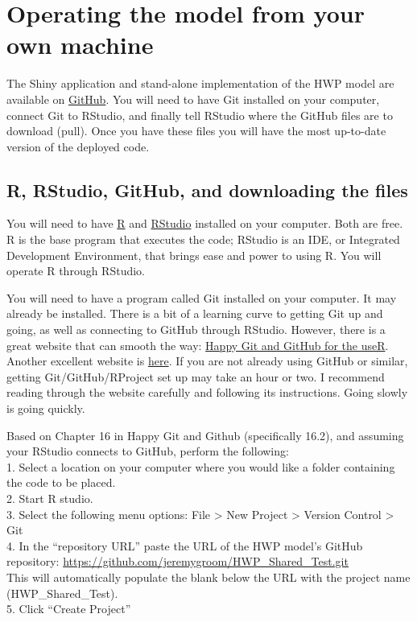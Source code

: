 \documentclass[
]{book}
\begin{document}
\hypertarget{run-opp}{%
\section{Operating the model from your own machine}\label{run-opp}}

The Shiny \citep{R-shiny} application and stand-alone implementation of the HWP model are available on \href{https://github.com/}{GitHub}. You will need to have Git installed on your computer, connect Git to RStudio, and finally tell RStudio where the GitHub files are to download (pull). Once you have these files you will have the most up-to-date version of the deployed code.

\hypertarget{run-opp-git}{%
\subsection{R, RStudio, GitHub, and downloading the files}\label{run-opp-git}}

You will need to have \href{https://www.r-project.org/}{R} and \href{https://www.rstudio.com/products/rstudio/}{RStudio} installed on your computer. Both are free. R is the base program that executes the code; RStudio is an IDE, or Integrated Development Environment, that brings ease and power to using R. You will operate R through RStudio.

You will need to have a program called Git installed on your computer. It may already be installed. There is a bit of a learning curve to getting Git up and going, as well as connecting to GitHub through RStudio. However, there is a great website that can smooth the way: \href{https://happygitwithr.com/index.html}{Happy Git and GitHub for the useR}. Another excellent website is \href{https://cfss.uchicago.edu/setup/git-with-rstudio/}{here}. If you are not already using GitHub or similar, getting Git/GitHub/RProject set up may take an hour or two. I recommend reading through the website carefully and following its instructions. Going slowly is going quickly.

Based on Chapter 16 in Happy Git and Github (specifically 16.2), and assuming your RStudio connects to GitHub, perform the following:\\
1. Select a location on your computer where you would like a folder containing the code to be placed.\\
2. Start R studio.\\
3. Select the following menu options: File \textgreater{} New Project \textgreater{} Version Control \textgreater{} Git\\
4. In the ``repository URL'' paste the URL of the HWP model's GitHub repository: \url{https://github.com/jeremygroom/HWP_Shared_Test.git}\\
This will automatically populate the blank below the URL with the project name (HWP\_Shared\_Test).\\
5. Click ``Create Project''
\end{document}

